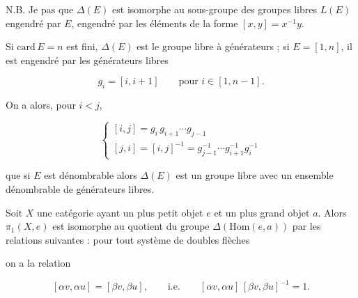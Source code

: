 \documentclass[11pt,a4paper]{article}
\begin{document}

N.B. Je  pas que $\Delta(E)$ est isomorphe au sous-groupe des
groupes libres $L(E)$ engendré par $E$, engendré par les éléments de la forme
$[x,y] = x^{-1}y$.

Si $\mathrm{card}\,E = n$ est fini, $\Delta(E)$ est le groupe libre à \ill{}
générateurs ; si $E = [1,n]$, il \struck{\ill{}} est engendré par les
générateurs libres 

\[
  g_{i} = [i, i+1] \qquad \text{pour } i \in [1, n-1].
\]


On a alors, pour $i < j$,

\[
  \begin{cases}
    [i,j] = g_{i}\,g_{i+1} \cdots g_{j-1} \\
    [j,i] = [i,j]^{-1} = g_{j-1}^{-1} \cdots g_{i+1}^{-1} g_{i}^{-1}
  \end{cases}
\]

 \struck{\ill{}} que si $E$ est dénombrable alors
$\Delta(E)$ est un groupe libre avec un ensemble dénombrable de générateurs
libres.

Soit $X$ une catégorie ayant un plus petit objet $e$ et un plus grand objet
$a$. Alors $\pi_{1}(X,e)$ est isomorphe \struck{\ill{}} au quotient du groupe
$\Delta(\mathrm{Hom}(e,a))$ par les relations suivantes : pour tout système de
doubles flèches


on a la relation

\[
  [\alpha v, \alpha u] = [\beta v, \beta u],
  \qquad \text{i.e.} \qquad [\alpha v, \alpha u]\,[\beta v, \beta u]^{-1} = 1 .
\]



 \qquad {} \qquad
{} \qquad {}
\end{document}
